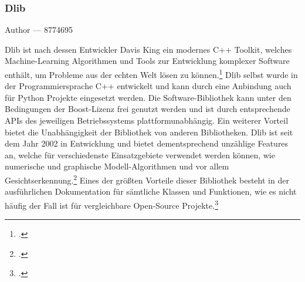 \documentclass[12pt, a4paper]{report}
\makeatletter
\newcommand{\sectionauthor}[1]{%
  {\parindent0pt\vspace*{-5pt}%
  \large{Author --- }
  \linespread{1.1}\large\scshape#1%
  \par\nobreak\vspace*{35pt} }
  \@afterheading%
}
\makeatother
\begin{document}
\subsubsection{Dlib}
\sectionauthor{8774695}
Dlib ist nach dessen Entwickler Davis King ein modernes C++ Toolkit, welches Machine-Learning Algorithmen und Tools zur Entwicklung komplexer Software enthält, um Probleme aus der echten Welt lösen zu können.\footcite[Vgl.]{netguru}
\newline
Dlib selbst wurde in der Programmiersprache C++ entwickelt und kann durch eine Anbindung auch für Python Projekte eingesetzt werden. Die Software-Bibliothek kann unter den Bedingungen der Boost-Lizenz frei genutzt werden und ist durch entsprechende APIs des jeweiligen Betriebssystems plattformunabhängig. Ein weiterer Vorteil bietet die Unabhängigkeit der Bibliothek von anderen Bibliotheken. %
Dlib ist seit dem Jahr 2002 in Entwicklung und bietet dementsprechend unzählige Features an, welche für verschiedenste Einsatzgebiete verwendet werden können, wie numerische und graphische Modell-Algorithmen und vor allem Gesichtserkennung.\footcite[Vgl.][]{netguru}
Eines der größten Vorteile dieser Bibliothek besteht in der ausführlichen Dokumentation für sämtliche Klassen und Funktionen, wie es nicht häufig der Fall ist für vergleichbare Open-Source Projekte.\footcite[Vgl.]{Dlib}
\end{document}
